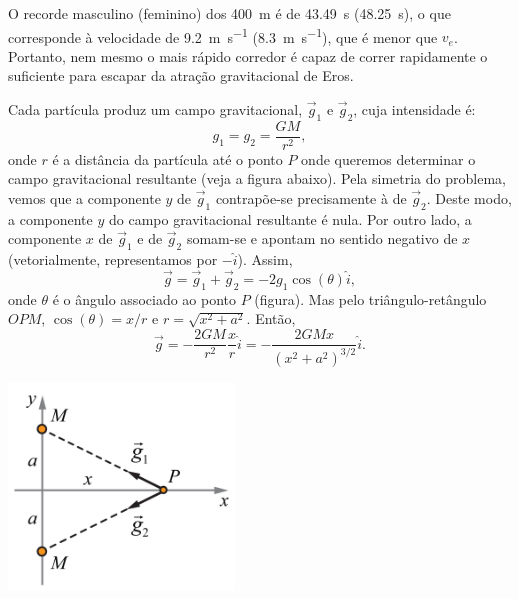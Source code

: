 \documentclass[a4paper]{article}
\begin{document}
\begin{resolucoes}
\begin{exercicio}
\begin{compactenum}[(a)]
  O recorde masculino (feminino) dos \SI{400}{\metre} é de \SI{43.49}{\second} (\SI{48.25}{\second}), o que corresponde à velocidade de \SI{9.2}{\metre\per\second} (\SI{8.3}{\metre\per\second}), que é menor que $v_e$.
  Portanto, nem mesmo o mais rápido corredor é capaz de correr rapidamente o suficiente para escapar da atração gravitacional de Eros.

  \end{compactenum}
  \end{exercicio}
  
  \begin{exercicio}
   
  Cada partícula produz um campo gravitacional, $\vec g_1$ e $\vec g_2$, cuja intensidade é:
  \begin{equation*}
  g_1 = g_2 = \frac{GM}{r^2},
  \end{equation*}
  onde $r$ é a distância da partícula até o ponto $P$ onde queremos determinar o campo gravitacional resultante (veja a figura abaixo).
  Pela simetria do problema, vemos que a componente $y$ de $\vec g_1$ contrapõe-se precisamente à de $\vec g_2$.
  Deste modo, a componente $y$ do campo gravitacional resultante é nula.
  Por outro lado, a componente $x$ de $\vec g_1$ e de $\vec g_2$ somam-se e apontam no sentido negativo de $x$ (vetorialmente, representamos por $-\hat i$).
  Assim,
  \begin{equation*}
  \vec g = \vec g_1 + \vec g_2 = -2g_1\cos(\theta)\hat i,
  \end{equation*}
  onde $\theta$ é o ângulo associado ao ponto $P$ (figura).
  Mas pelo triângulo-retângulo $OPM$, $\cos(\theta)=x/r$ e $r = \sqrt{x^2 + a^2}$.
  Então,
  \begin{equation*}
  \vec g = -\frac{2GM}{r^2}\frac{x}{r}\hat i = -\frac{2GMx}{\left(x^2 + a^2\right)^{3/2}} \hat i.
  \end{equation*}

  \begin{center}
  \includegraphics[width=0.45\textwidth]{fig002}
  \end{center}


\end{exercicio}
\end{resolucoes}
\end{document}
